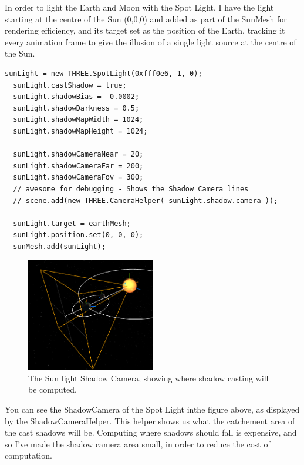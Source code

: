 \documentclass[12pt]{article}
\begin{document}
In order to light the Earth and Moon with the Spot Light, I have the light starting at the centre of the Sun (0,0,0) and added as part of the SunMesh for rendering efficiency, and its target set as the position of the Earth, tracking it every animation frame to give the illusion of a single light source at the centre of the Sun.
\begin{lstlisting}
sunLight = new THREE.SpotLight(0xfff0e6, 1, 0);
  sunLight.castShadow = true;
  sunLight.shadowBias = -0.0002;
  sunLight.shadowDarkness = 0.5;
  sunLight.shadowMapWidth = 1024;
  sunLight.shadowMapHeight = 1024;

  sunLight.shadowCameraNear = 20;
  sunLight.shadowCameraFar = 200;
  sunLight.shadowCameraFov = 300;
  // awesome for debugging - Shows the Shadow Camera lines
  // scene.add(new THREE.CameraHelper( sunLight.shadow.camera ));

  sunLight.target = earthMesh;    
  sunLight.position.set(0, 0, 0);
  sunMesh.add(sunLight);
\end{lstlisting}

\begin{figure}[H]
        \centering
       
                \includegraphics[width=0.5\textwidth]{images/shadowcamera}
                \caption{The Sun light Shadow Camera, showing where shadow casting will be computed.}
                \label{fig: The Shadow Camera.}
      
\end{figure}

You can see the ShadowCamera of the Spot Light inthe figure above, as displayed by the ShadowCameraHelper. This helper shows us what the catchement area of the cast shadows will be. Computing where shadows should fall is expensive, and so I've made the shadow camera area small, in order to reduce the cost of computation.


\end{document}
